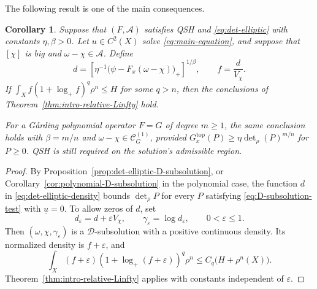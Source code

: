\documentclass[oneside,english,letterpaper]{amsart}
\numberwithin{equation}{section}
\theoremstyle{plain}
\newtheorem{cor}[thm]{Corollary}
\theoremstyle{definition}
\theoremstyle{remark}
\begin{document}
The following result is one of the main consequences.

\begin{cor}
	\label{cor:det-elliptic-Linfty}
	Suppose that $(F,\mathcal A)$ satisfies QSH and
	\eqref{eq:det-elliptic}
	with constants $\eta,\beta>0$. Let $u\in C^2(X)$ solve
	\eqref{eq:main-equation}, and suppose that $[\chi]$ is big and
	$\omega-\chi\in\mathcal A$. Define
	\begin{equation}
		\label{eq:det-elliptic-density}
		d=\left[\eta^{-1}\bigl(\psi-F_x(\omega-\chi)\bigr)_+\right]^{1/\beta},
		\qquad f=\frac d{V_\chi}.
	\end{equation}
	If $\int_X f(1+\log_+f)^q\rho^n\leq H$ for some $q>n$,
	then the conclusions of
	Theorem~\ref{thm:intro-relative-Linfty} hold.

For a G{\aa}rding polynomial operator $F=G$ of degree $m\geq1$,
the same conclusion holds with $\beta=m/n$ and
$\omega-\chi\in\mathcal C_G^{(1)}$, provided
$G_x^{\mathrm{top}}(P)\geq\eta\det_\rho(P)^{m/n}$ for $P\geq0$.
QSH is still required on the solution's admissible region.
\end{cor}

\begin{proof}
	By Proposition~\ref{prop:det-elliptic-D-subsolution}, or Corollary~\ref{cor:polynomial-D-subsolution} in the polynomial case, the function
	$d$ in \eqref{eq:det-elliptic-density} bounds $\det_\rho P$ for every
	$P$ satisfying \eqref{eq:D-subsolution-test} with $\underline u=0$.
	To allow zeros of $d$, set
	$$
	d_\varepsilon=d+\varepsilon V_\chi,
	\qquad \gamma_\varepsilon=\log d_\varepsilon,
	\qquad 0<\varepsilon\leq1.
	$$
	Then $(\omega,\chi,\gamma_\varepsilon)$ is a $\mathcal D$-subsolution
	with a positive continuous density. Its normalized density is
	$f+\varepsilon$, and
	$$
	\int_X(f+\varepsilon)(1+\log_+(f+\varepsilon))^q\rho^n
	\leq C_q\bigl(H+\rho^n(X)\bigr).
	$$
	Theorem~\ref{thm:intro-relative-Linfty}
	applies with constants independent of $\varepsilon$.
\end{proof}
\end{document}
